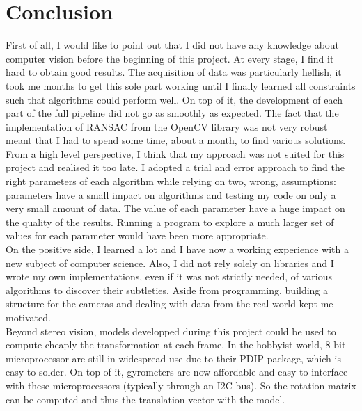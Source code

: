 \documentclass[11pt]{report}
\begin{document}
\chapter*{Conclusion}
\label{chap:Conclusion}
First of all, I would like to point out that I did not have any knowledge about computer vision before the beginning of this project. At every stage, I find it hard to obtain good results. The acquisition of data was particularly hellish, it took me months to get this sole part working until I finally learned all constraints such that algorithms could perform well. On top of it, the development of each part of the full pipeline did not go as smoothly as expected. The fact that the implementation of RANSAC from the OpenCV library was not very robust meant that I had to spend some time, about a month, to find various solutions. From a high level perspective, I think that my approach was not suited for this project and realised it too late. I adopted a trial and error approach to find the right parameters of each algorithm while relying on two, wrong, assumptions: parameters have a small impact on algorithms and testing my code on only a very small amount of data. The value of each parameter have a huge impact on the quality of the results. Running a program to explore a much larger set of values for each parameter would have been more appropriate.
\\
On the positive side, I learned a lot and I have now a working experience with a new subject of computer science. Also, I did not rely solely on libraries and I wrote my own implementations, even if it was not strictly needed, of various algorithms to discover their subtleties. Aside from programming, building a structure for the cameras and dealing with data from the real world kept me motivated.
\\
Beyond stereo vision, models developped during this project could be used to compute cheaply the transformation at each frame. In the hobbyist world, 8-bit microprocessor are still in widespread use due to their PDIP package, which is easy to solder. On top of it, gyrometers are now affordable and easy to interface with these microprocessors (typically through an I2C bus). So the rotation matrix can be computed and thus the translation vector with the model.


\clearpage


\end{document}
